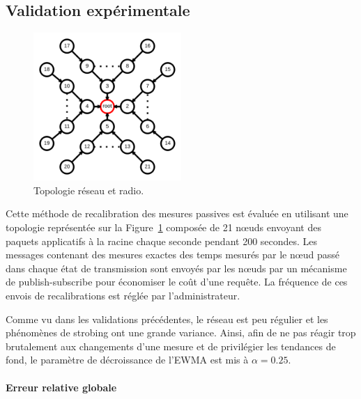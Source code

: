 \subsection{Validation expérimentale}

\begin{figure}[ht]
  \centering
  \includegraphics[width=0.5\textwidth]{img/topology_tree.png}
  \caption{Topologie réseau et radio.}
  \label{supervision:fig:topology_tree}
\end{figure}

Cette méthode de recalibration des mesures passives est évaluée en utilisant une topologie représentée sur la Figure~\ref{supervision:fig:topology_tree} composée de 21 nœuds envoyant des paquets applicatifs à la racine chaque seconde pendant 200 secondes.
Les messages contenant des mesures exactes des temps mesurés par le nœud passé dans chaque état de transmission sont envoyés par les nœuds par un mécanisme de publish-subscribe pour économiser le coût d'une requête.
La fréquence de ces envois de recalibrations est réglée par l'administrateur.

Comme vu dans les validations précédentes, le réseau est peu régulier et les phénomènes de strobing ont une grande variance.
Ainsi, afin de ne pas réagir trop brutalement aux changements d'une mesure et de privilégier les tendances de fond, le paramètre de décroissance de l'\ac{EWMA} est mis à $\alpha = 0.25$.

\paragraph{Erreur relative globale}

